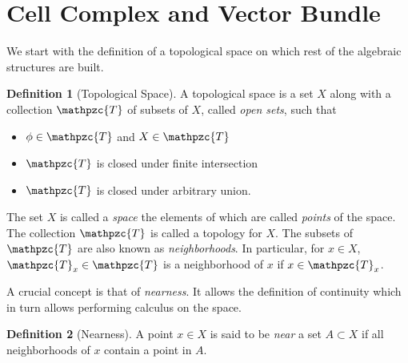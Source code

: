 \documentclass[11pt, reqno]{amsart}
\newcommand{\script}[1]{\mathpzc{#1}}
\theoremstyle{definition}
\newtheorem{dfn}{Definition}
\begin{document}




\section{Cell Complex and Vector Bundle}

We start with the definition of a topological space on which rest of
the algebraic structures are built.
\begin{dfn}[Topological Space]
  A topological space is a set $X$ along with a collection
  $\script{T}$ of subsets of $X$, called \emph{open sets}, such that
  \begin{itemize}
  \item $\phi \in \script{T}$ and $X \in \script{T}$
  \item $\script{T}$ is closed under finite intersection
  \item $\script{T}$ is closed under arbitrary union.
  \end{itemize}
\end{dfn}
The set $X$ is called a \emph{space} the elements of which are called
\emph{points} of the space. The collection $\script{T}$ is called a
topology for $X$. The subsets of $\script{T}$ are also known as
\emph{neighborhoods}. In particular, for $x\in X$, $\script{T}_x \in
\script{T}$ is a neighborhood of $x$ if $x\in \script{T}_x$.

A crucial concept is that of \emph{nearness}. It allows the definition
of continuity which in turn allows performing calculus on the space.
\begin{dfn}[Nearness]
  A point $x\in X$ is said to be \emph{near} a set $A \subset X$ if
  all neighborhoods of $x$ contain a point in $A$.
\end{dfn}
\end{document}
